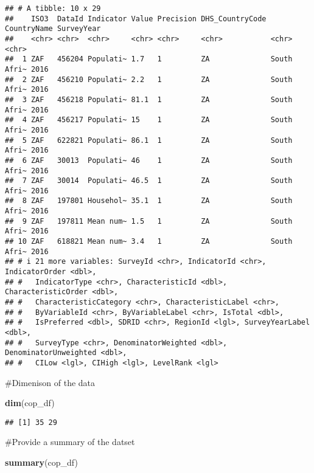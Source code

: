 \documentclass[
]{article}
\newenvironment{Shaded}{\begin{snugshade}}{\end{snugshade}}
\newcommand{\FunctionTok}[1]{\textcolor[rgb]{0.13,0.29,0.53}{\textbf{#1}}}
\newcommand{\NormalTok}[1]{#1}
\begin{document}
\begin{verbatim}
## # A tibble: 10 x 29
##    ISO3  DataId Indicator Value Precision DHS_CountryCode CountryName SurveyYear
##    <chr> <chr>  <chr>     <chr> <chr>     <chr>           <chr>       <chr>     
##  1 ZAF   456204 Populati~ 1.7   1         ZA              South Afri~ 2016      
##  2 ZAF   456210 Populati~ 2.2   1         ZA              South Afri~ 2016      
##  3 ZAF   456218 Populati~ 81.1  1         ZA              South Afri~ 2016      
##  4 ZAF   456217 Populati~ 15    1         ZA              South Afri~ 2016      
##  5 ZAF   622821 Populati~ 86.1  1         ZA              South Afri~ 2016      
##  6 ZAF   30013  Populati~ 46    1         ZA              South Afri~ 2016      
##  7 ZAF   30014  Populati~ 46.5  1         ZA              South Afri~ 2016      
##  8 ZAF   197801 Househol~ 35.1  1         ZA              South Afri~ 2016      
##  9 ZAF   197811 Mean num~ 1.5   1         ZA              South Afri~ 2016      
## 10 ZAF   618821 Mean num~ 3.4   1         ZA              South Afri~ 2016      
## # i 21 more variables: SurveyId <chr>, IndicatorId <chr>, IndicatorOrder <dbl>,
## #   IndicatorType <chr>, CharacteristicId <dbl>, CharacteristicOrder <dbl>,
## #   CharacteristicCategory <chr>, CharacteristicLabel <chr>,
## #   ByVariableId <chr>, ByVariableLabel <chr>, IsTotal <dbl>,
## #   IsPreferred <dbl>, SDRID <chr>, RegionId <lgl>, SurveyYearLabel <dbl>,
## #   SurveyType <chr>, DenominatorWeighted <dbl>, DenominatorUnweighted <dbl>,
## #   CILow <lgl>, CIHigh <lgl>, LevelRank <lgl>
\end{verbatim}

\#Dimenison of the data

\begin{Shaded}
\begin{Highlighting}[]
\FunctionTok{dim}\NormalTok{(cop\_df)}
\end{Highlighting}
\end{Shaded}

\begin{verbatim}
## [1] 35 29
\end{verbatim}

\#Provide a summary of the datset

\begin{Shaded}
\begin{Highlighting}[]
\FunctionTok{summary}\NormalTok{(cop\_df)}
\end{Highlighting}
\end{Shaded}
\end{document}
